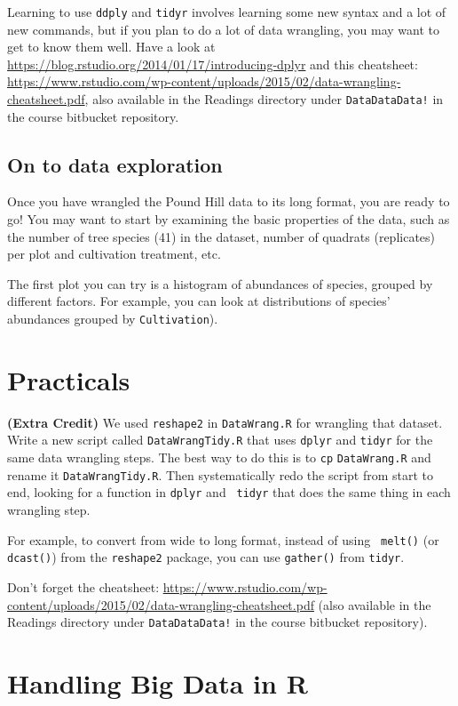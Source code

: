 Learning to use {\tt ddply} and {\tt tidyr} involves learning some new 
syntax and a lot of new commands, but if you plan to do a lot of data 
wrangling, you may want to get to know them well. Have a 
look at \url{https://blog.rstudio.org/2014/01/17/introducing-dplyr} and 
this cheatsheet: 
\url{https://www.rstudio.com/wp-content/uploads/2015/02/data-wrangling-cheatsheet.pdf}, also available in the Readings directory under {\tt DataDataData!} in 
the course bitbucket repository.

\subsection{On to data exploration}

Once you have wrangled the Pound Hill data to its long format, you are 
ready to go! You may want to start by examining the basic properties 
of the data, such as the number of tree species (41) in the dataset, 
number of quadrats (replicates) per plot and cultivation treatment, 
etc.

The first plot you can try is a histogram of abundances of species, 
grouped by different factors. For example, you can look at 
distributions of species' abundances grouped by {\tt Cultivation}). 

\section{Practicals}

{\bf (Extra Credit)} We used {\tt reshape2} in {\tt DataWrang.R} for 
wrangling that dataset. Write a new script called {\tt DataWrangTidy.R} 
that uses {\tt dplyr} and {\tt tidyr} for the same data wrangling 
steps. The best way to do this is to {\tt cp} {\tt DataWrang.R} and 
rename it {\tt DataWrangTidy.R}. Then systematically redo the script 
from start to end, looking for a function in {\tt dplyr} and {\tt 
tidyr} that does the same thing in each wrangling step. 

For example, to convert from wide to long format, instead of using {\tt 
melt()} (or {\tt dcast()}) from the {\tt reshape2} package, you can use  
{\tt gather()} from {\tt tidyr}.

Don't forget the cheatsheet: 
\url{https://www.rstudio.com/wp-content/uploads/2015/02/data-wrangling-cheatsheet.pdf} 
(also available in the Readings directory under {\tt DataDataData!} in 
the course bitbucket repository).

\section{Handling Big Data in R}

